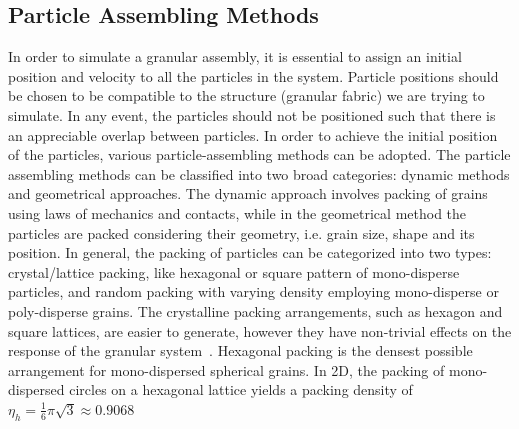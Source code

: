 \subsection{Particle Assembling Methods}
In order to simulate a granular assembly, it is essential to assign an initial 
position and 
velocity to all the particles in the system. Particle positions should be 
chosen to be compatible 
to the structure (granular fabric) we are trying to simulate. In any event, the 
particles should 
not be positioned such that there is an appreciable overlap between particles. 
In order to achieve 
the initial position of the particles, various particle-assembling methods can 
be adopted. The 
particle assembling methods can be classified into two broad categories: 
dynamic methods and 
geometrical approaches. The dynamic approach involves packing of grains using 
laws of mechanics 
and 
contacts, while in the geometrical method the particles are packed considering 
their geometry, 
i.e. 
grain size, shape and its position. In general, the packing of particles can be 
categorized into 
two types: crystal/lattice packing, like hexagonal or square pattern of 
mono-disperse particles, 
and random packing with varying density employing mono-disperse or 
poly-disperse grains. The 
crystalline packing arrangements, such as hexagon and square lattices, are 
easier to generate, 
however they have non-trivial effects on the response of the granular 
system~\citep{Staron2005}. 
Hexagonal packing is the densest possible arrangement for mono-dispersed 
spherical grains. In 2D, 
the packing of mono-dispersed circles on a hexagonal lattice yields a packing 
density of 
$\eta_{\mathit{h}}=\frac{1}{6}\pi\sqrt{3}\approx 0.9068$

